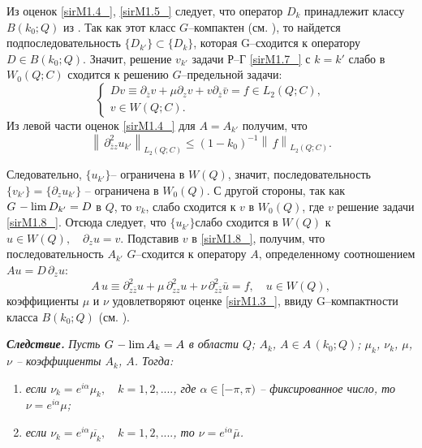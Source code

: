 Из оценок \eqref{sirM1.4_}, \eqref{sirM1.5_} следует, что оператор  $D_{k} $ принадлежит классу $B(k_{0} ;Q)$ из
\cite{Sirazh3}. Так как этот класс   $G$--компактен  (см. \cite{Sirazh3}), то найдется подпоследовательность $\{ D_{k'} \} \subset \{ D_{k} \} $, которая G--сходится к оператору $D\in B(k_{0} ;Q)$. Значит, решение $v_{k'} $ задачи Р--Г \eqref{sirM1.7_} с $k=k'$ слабо в $W_{0} (Q;C)$ сходится к решению $G$--предельной задачи:
\begin{equation}\label{sirM1.8_}
\left\{\begin{array}{l} {Dv\equiv \partial _{\bar{z}} v+\mu \partial _{z} v+v\partial _{\bar{z}} \bar{v}=f\in L_{2} (Q;C),} \\ {v\in W(Q;C).} \end{array}\right.
\end{equation}
Из левой части оценок \eqref{sirM1.4_} для $A=A_{k'} $ получим, что
\begin{equation*}
\left\| \, \partial _{\bar{z}z}^{2} u_{k'} \right\| _{L_{2} (Q;C)} \le (1-k_{0} )^{-1} \left\| \, f\right\| _{L_{2} (Q;C)}.
\end{equation*}

   Следовательно, $\{ u_{k'} \} $-- ограничена в $W(Q)$, значит, последовательность $\{ v_{k'} \} =\{ \partial _{z} u_{k'} \} $ -- ограничена в $W_{0} (Q)$. С другой стороны, так как \textit{$G{\kern 1pt} -\lim D_{k'} =D$} в $Q$, то $v_{k} $, слабо сходится к $v$ в $W_{0} (Q)$, где $v$ решение задачи \eqref{sirM1.8_}. Отсюда следует, что $\{ u_{k'} \} $слабо сходится в $W(Q)$ к  $u\in W(Q),\quad \partial _{z} u=v$. Подставив $v$ в \eqref{sirM1.8_}, получим, что последовательность $A_{k'} $ $G$--сходится к оператору $A$, определенному соотношением $Au=D\, \partial _{z} u$:
\begin{equation*}
A\, u\equiv \partial _{z\bar{z}}^{2} u+\mu \, \partial _{zz}^{2} u+\nu \, \partial _{z\bar{z}}^{2} \bar{u}=f,\quad u\in W(Q),
\end{equation*}
коэффициенты $\mu $ и $\nu $ удовлетворяют оценке \eqref{sirM1.3_}, ввиду G--компактности класса $B(k_{0} ;Q)$   (см. \cite{Sirazh3}).



\textbf{\textit{Следствие.}} \textit{Пусть $G{\kern 1pt} -\lim A_{k} =A$ в области $Q$; $A_{k} $, $A\in A\, (k_{0} ;Q)$; $\mu _{k} $, $\nu _{k} $, $\mu $, $\nu $ -- коэффициенты $A_{k} $, $A$. Тогда:}

\begin{enumerate}
\item \textit{ если $\nu _{k} =e^{i\alpha } \mu _{k} ,\quad k=1,2,....$, где $\alpha \in [-\pi ,\pi )$ -- фиксированное число, то $\nu =e^{i\alpha } \mu $;}

\item \textit{ если $\nu _{k} =e^{i\alpha } \overline{\mu _{k} },\quad k=1,2,....$, то $\nu =e^{i\alpha } \bar{\mu }$.}
\end{enumerate}

